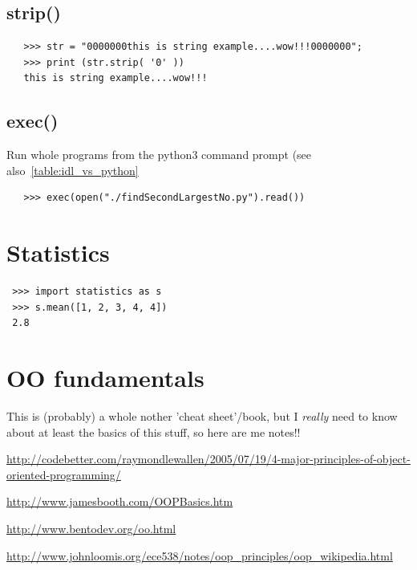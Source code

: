 \documentclass[11pt,a4paper]{article}
\begin{document}
    \subsection{strip()}  
    \begin{lstlisting}
   >>> str = "0000000this is string example....wow!!!0000000";
   >>> print (str.strip( '0' ))
   this is string example....wow!!!
  \end{lstlisting}

    \subsection{exec()}  
    Run whole programs from the python3 command prompt (see also~\ref{table:idl_vs_python}
    \begin{lstlisting}
   >>> exec(open("./findSecondLargestNo.py").read())
  \end{lstlisting}


\newpage
\section{Statistics}
 \begin{lstlisting}
 >>> import statistics as s
 >>> s.mean([1, 2, 3, 4, 4])
 2.8
 \end{lstlisting}



\newpage
\section{OO fundamentals}
This is (probably) a whole nother 'cheat sheet'/book, but I {\it really} need to know about at least the basics of this stuff, so here are me notes!!

\smallskip
\smallskip
\noindent
\href{http://codebetter.com/raymondlewallen/2005/07/19/4-major-principles-of-object-oriented-programming/}{http://codebetter.com/raymondlewallen/2005/07/19/4-major-principles-of-object-oriented-programming/}

\smallskip
\smallskip
\noindent
\href{http://www.jamesbooth.com/OOPBasics.htm}{http://www.jamesbooth.com/OOPBasics.htm}

\smallskip
\smallskip
\noindent
\href{http://www.bentodev.org/oo.html}{http://www.bentodev.org/oo.html}

\smallskip
\smallskip
\noindent
\href{http://www.johnloomis.org/ece538/notes/oop\_principles/oop\_wikipedia.html}{http://www.johnloomis.org/ece538/notes/oop\_principles/oop\_wikipedia.html}
\end{document}
